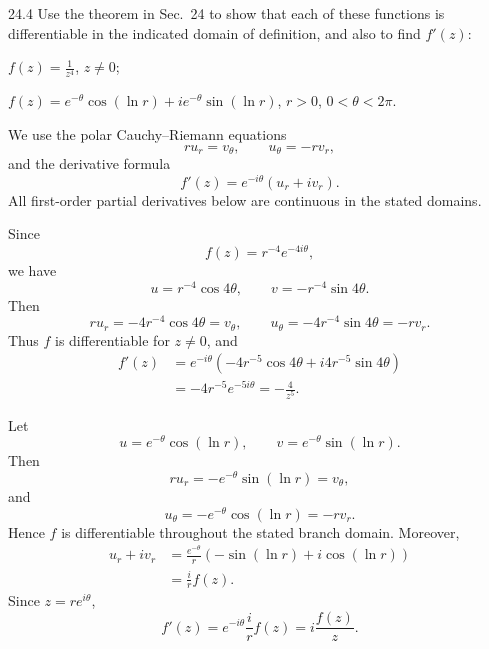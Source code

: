 \documentclass[11pt,oneside]{article}
\begin{document}
\begin{exercise}{24.4}
Use the theorem in Sec.~24 to show that each of these functions is differentiable in the indicated domain of definition, and also to find \(f'(z)\):
\begin{exercisesubparts}
    \item \(\displaystyle f(z)=\frac1{z^4}\), \(z\ne0\);
    \item \(\displaystyle f(z)=e^{-\theta}\cos(\ln r)+i e^{-\theta}\sin(\ln r)\), \(r>0\), \(0<\theta<2\pi\).
\end{exercisesubparts}
\end{exercise}

\begin{solution}
We use the polar Cauchy--Riemann equations
\[
    r u_r=v_\theta,
    \qquad
    u_\theta=-r v_r,
\]
and the derivative formula
\[
    f'(z)=e^{-i\theta}(u_r+i v_r).
\]
All first-order partial derivatives below are continuous in the stated domains.
\begin{exercisesubparts}
    \item Since
    \[
        f(z)=r^{-4}e^{-4i\theta},
    \]
    we have
    \[
        u=r^{-4}\cos4\theta,
        \qquad
        v=-r^{-4}\sin4\theta.
    \]
    Then
    \[
        r u_r=-4r^{-4}\cos4\theta=v_\theta,
        \qquad
        u_\theta=-4r^{-4}\sin4\theta=-r v_r.
    \]
    Thus \(f\) is differentiable for \(z\ne0\), and
    \[
    \begin{aligned}
        f'(z)
        &=e^{-i\theta}
          \left(-4r^{-5}\cos4\theta+i4r^{-5}\sin4\theta\right)\\
        &=-4r^{-5}e^{-5i\theta}
        =\boxed{-\frac4{z^5}}.
    \end{aligned}
    \]

    \item Let
    \[
        u=e^{-\theta}\cos(\ln r),
        \qquad
        v=e^{-\theta}\sin(\ln r).
    \]
    Then
    \[
        r u_r=-e^{-\theta}\sin(\ln r)=v_\theta,
    \]
    and
    \[
        u_\theta=-e^{-\theta}\cos(\ln r)=-r v_r.
    \]
    Hence \(f\) is differentiable throughout the stated branch domain. Moreover,
    \[
    \begin{aligned}
        u_r+i v_r
        &=\frac{e^{-\theta}}r
          \left(-\sin(\ln r)+i\cos(\ln r)\right)\\
        &=\frac{i}{r}f(z).
    \end{aligned}
    \]
    Since \(z=re^{i\theta}\),
    \[
        \boxed{f'(z)=e^{-i\theta}\frac{i}{r}f(z)
        =i\frac{f(z)}z}.
    \]
\end{exercisesubparts}
\end{solution}
\end{document}
